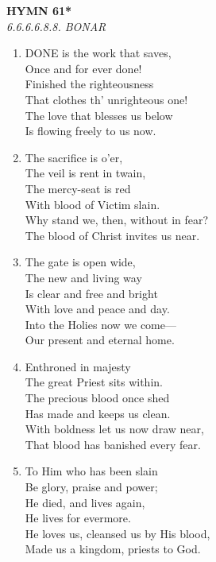\documentclass[11pt,a4paper]{article}
\begin{document}
\newpage
\begin{center}
    {\Large \textbf{HYMN 61*}}
    \\
    \textit{6.6.6.6.8.8. BONAR}
\end{center}
\vspace{1em}

\begin{enumerate}
    \item DONE is the work that saves, \\
        Once and for ever done! \\
        Finished the righteousness \\
        That clothes th' unrighteous one! \\
        The love that blesses us below \\
        Is flowing freely to us now.

    \item The sacrifice is o'er, \\
        The veil is rent in twain, \\
        The mercy-seat is red \\
        With blood of Victim slain. \\
        Why stand we, then, without in fear? \\
        The blood of Christ invites us near.

    \item The gate is open wide, \\
        The new and living way \\
        Is clear and free and bright \\
        With love and peace and day. \\
        Into the Holies now we come--- \\
        Our present and eternal home.

    \item Enthroned in majesty \\
        The great Priest sits within. \\
        The precious blood once shed \\
        Has made and keeps us clean. \\
        With boldness let us now draw near, \\
        That blood has banished every fear.

    \item To Him who has been slain \\
        Be glory, praise and power; \\
        He died, and lives again, \\
        He lives for evermore. \\
        He loves us, cleansed us by His blood, \\
        Made us a kingdom, priests to God.

\end{enumerate}
\end{document}
